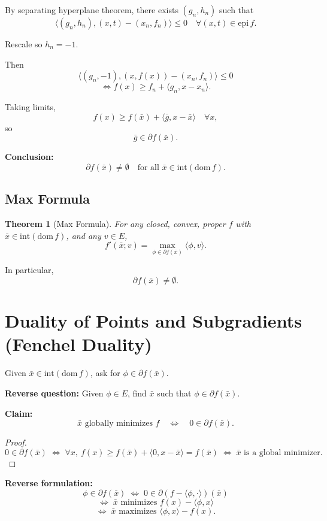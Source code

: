\documentclass[12pt,oneside]{book}
\numberwithin{equation}{section}
\theoremstyle{definition}
\theoremstyle{plain}
\newtheorem{theorem}{Theorem}[section]
\theoremstyle{remark}
\begin{document}
By separating hyperplane theorem, there exists $(g_n,h_n)$ such that
\[
\langle (g_n,h_n), (x,t) - (x_n,f_n) \rangle \le 0
\quad \forall (x,t) \in \mathrm{epi}\, f.
\]

Rescale so $h_n = -1$.

Then
\[
\langle (g_n,-1), (x,f(x)) - (x_n,f_n) \rangle \le 0
\]
\[
\iff
f(x) \ge f_n + \langle g_n, x - x_n \rangle.
\]

Taking limits,
\[
f(x) \ge f(\bar{x}) + \langle \bar{g}, x - \bar{x} \rangle
\quad \forall x,
\]
so
\[
\bar{g} \in \partial f(\bar{x}).
\]

\textbf{Conclusion:}
\[
\partial f(\bar{x}) \neq \emptyset
\quad \text{for all } \bar{x} \in \mathrm{int}(\mathrm{dom}\, f).
\]

\subsection{Max Formula}

\begin{theorem}[Max Formula]
For any closed, convex, proper $f$ with $\bar{x} \in \mathrm{int}(\mathrm{dom}\, f)$, and any $v \in E$,
\[
f'(\bar{x};v)
=
\max_{\phi \in \partial f(\bar{x})} \langle \phi, v \rangle.
\]
\end{theorem}

In particular,
\[
\partial f(\bar{x}) \neq \emptyset.
\]

\section{Duality of Points and Subgradients (Fenchel Duality)}

Given $\bar{x} \in \mathrm{int}(\mathrm{dom}\,f)$, ask for $\phi \in \partial f(\bar{x})$.

\textbf{Reverse question:} Given $\phi \in E$, find $\bar{x}$ such that $\phi \in \partial f(\bar{x})$.

\textbf{Claim:}
\[
\bar{x} \text{ globally minimizes } f \quad \Longleftrightarrow \quad 0 \in \partial f(\bar{x}).
\]

\begin{proof}
\[
0 \in \partial f(\bar{x})
\;\Longleftrightarrow\;
\forall x,\ f(x) \ge f(\bar{x}) + \langle 0, x-\bar{x} \rangle
= f(\bar{x})
\;\Longleftrightarrow\;
\bar{x} \text{ is a global minimizer.}
\]
\end{proof}

\textbf{Reverse formulation:}
\[
\phi \in \partial f(\bar{x})
\;\Longleftrightarrow\;
0 \in \partial (f - \langle \phi, \cdot \rangle)(\bar{x})
\]
\[
\Longleftrightarrow\;
\bar{x} \text{ minimizes } f(x) - \langle \phi, x \rangle
\]
\[
\Longleftrightarrow\;
\bar{x} \text{ maximizes } \langle \phi, x \rangle - f(x).
\]
\end{document}
